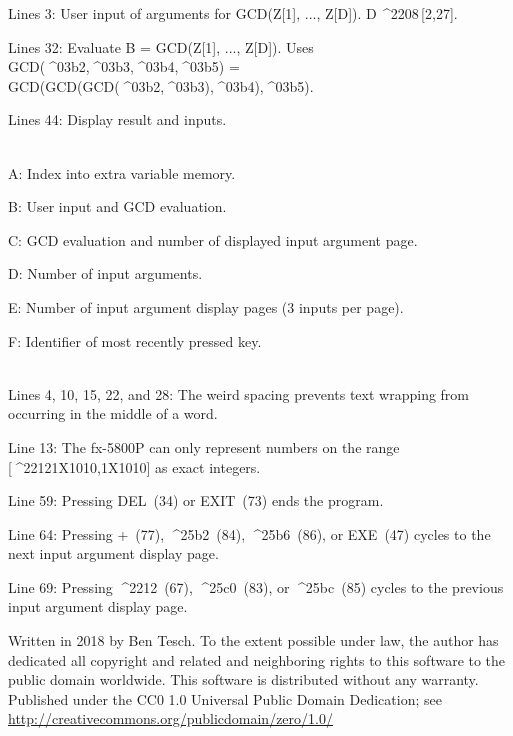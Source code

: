 \documentclass[11pt,letterpaper,twocolumn]{article}
\newcommand{\MINUS}{^^^^2212}
\newcommand{\EXPTEN}{{\scriptsize X10}}
\newcommand{\ELEM}{^^^^2208}
\newcommand{\BETA}{^^^^03b2}
\newcommand{\GAMMA}{^^^^03b3}
\newcommand{\DELTA}{^^^^03b4}
\newcommand{\EPSILON}{^^^^03b5}
\newcommand{\UPTRIANG}{^^^^25b2}
\newcommand{\RIGHTTRIANG}{^^^^25b6}
\newcommand{\DOWNTRIANG}{^^^^25bc}
\newcommand{\LEFTTRIANG}{^^^^25c0}
\begin{document}
Lines 3: User input of arguments for GCD(Z[1], ..., Z[D]). D\,\ELEM \,[2,27].

Lines 32: Evaluate B = GCD(Z[1], ..., Z[D]). Uses GCD(\BETA,\GAMMA,\DELTA,\EPSILON) = GCD(GCD(GCD(\BETA,\GAMMA),\DELTA),\EPSILON).

Lines 44: Display result and inputs.

\\
A: Index into extra variable memory.

B: User input and GCD evaluation.

C: GCD evaluation and number of displayed input argument page.

D: Number of input arguments.

E: Number of input argument display pages (3 inputs per page).

F: Identifier of most recently pressed key.

\\
Lines 4, 10, 15, 22, and 28: The weird spacing prevents text wrapping from occurring in the middle of a word.

Line 13: The fx-5800P can only represent numbers on the range [\MINUS 1\EXPTEN 10,1\EXPTEN 10] as exact integers.

Line 59: Pressing DEL~(34) or EXIT~(73) ends the program.

Line 64: Pressing +~(77), \UPTRIANG~(84), \RIGHTTRIANG~(86), or EXE~(47) cycles to the next input argument display page.

Line 69: Pressing \MINUS~(67), \LEFTTRIANG~(83), or \DOWNTRIANG~(85) cycles to the previous input argument display page.

\vspace{3ex}
\scriptsize{Written in 2018 by Ben Tesch. To the extent possible under law, the author has dedicated all copyright and related and neighboring rights to this software to the public domain worldwide. This software is distributed without any warranty. Published under the CC0 1.0 Universal Public Domain Dedication; see \url{http://creativecommons.org/publicdomain/zero/1.0/}} 
\end{document}
